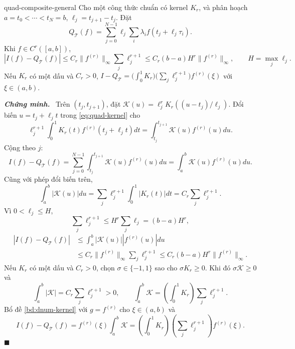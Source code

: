\documentclass[12pt,a4paper,oneside]{book}
\numberwithin{algorithm}{chapter}
\theoremstyle{definition}
\newenvironment{chungminh}{\par\medskip\noindent\textbf{\textit{\color{mainblue}Chứng minh.}}\ }{\hfill$\blacksquare$\par\medskip}
\begin{document}
\begin{menhde}{}{quad-composite-general}
Cho một công thức chuẩn có kernel $K_r$, và phân hoạch $a=t_0<\cdots<t_N=b$, $\ell_j=t_{j+1}-t_j$. Đặt
\[
 Q_{\mathcal T}(f)=\sum_{j=0}^{N-1}\ell_j\sum_i\lambda_i f(t_j+\ell_j\tau_i).
\]
Khi $f\in C^r([a,b])$,
\[
 |I(f)-Q_{\mathcal T}(f)|\leq C_r\lVert f^{(r)}\rVert_\infty\sum_j\ell_j^{r+1}
 \leq C_r(b-a)H^r\lVert f^{(r)}\rVert_\infty,
 \qquad H=\max_j\ell_j.
\]
Nếu $K_r$ có một dấu và $C_r>0$, $I-Q_{\mathcal T}=\bigl(\int_0^1K_r\bigr)\bigl(\sum_j\ell_j^{r+1}\bigr)f^{(r)}(\xi)$ với $\xi\in(a,b)$.
\end{menhde}
\begin{chungminh}
Trên $(t_j,t_{j+1})$, đặt $\mathcal K(u)=\ell_j^rK_r((u-t_j)/\ell_j)$. Đổi biến $u=t_j+\ell_jt$ trong \eqref{eq:quad-kernel} cho
\[
 \ell_j^{r+1}\int_0^1K_r(t)f^{(r)}(t_j+\ell_jt)dt
 =\int_{t_j}^{t_{j+1}}\mathcal K(u)f^{(r)}(u)du.
\]
Cộng theo $j$:
\[
 I(f)-Q_{\mathcal T}(f)
 =\sum_{j=0}^{N-1}\int_{t_j}^{t_{j+1}}\mathcal K(u)f^{(r)}(u)du
 =\int_a^b\mathcal K(u)f^{(r)}(u)du.
\]
Cũng với phép đổi biến trên,
\[
 \int_a^b|\mathcal K(u)|du
 =\sum_j\ell_j^{r+1}\int_0^1|K_r(t)|dt=C_r\sum_j\ell_j^{r+1}.
\]
Vì $0<\ell_j\leq H$,
\[
 \sum_j\ell_j^{r+1}\leq H^r\sum_j\ell_j=(b-a)H^r,
\]
\begin{align*}
 |I(f)-Q_{\mathcal T}(f)|
 &\leq\int_a^b|\mathcal K(u)||f^{(r)}(u)|du\\
 &\leq C_r\|f^{(r)}\|_\infty\sum_j\ell_j^{r+1}
 \leq C_r(b-a)H^r\|f^{(r)}\|_\infty.
\end{align*}
Nếu $K_r$ có một dấu và $C_r>0$, chọn $\sigma\in\{-1,1\}$ sao cho $\sigma K_r\geq0$. Khi đó $\sigma\mathcal K\geq0$ và
\[
 \int_a^b|\mathcal K|=C_r\sum_j\ell_j^{r+1}>0,\qquad
 \int_a^b\mathcal K=\left(\int_0^1K_r\right)\sum_j\ell_j^{r+1}.
\]
Bổ đề \ref{bd:dnum-kernel} với $g=f^{(r)}$ cho $\xi\in(a,b)$ và
\[
 I(f)-Q_{\mathcal T}(f)
 =f^{(r)}(\xi)\int_a^b\mathcal K
 =\left(\int_0^1K_r\right)\left(\sum_j\ell_j^{r+1}\right)f^{(r)}(\xi).
\]
\end{chungminh}
\end{document}
